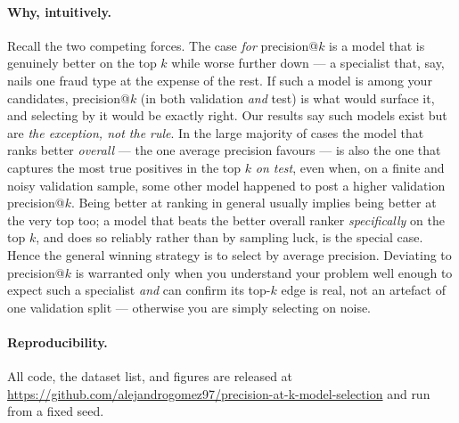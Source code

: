 \documentclass[11pt]{article}
\begin{document}
\paragraph{Why, intuitively.} Recall the two competing forces. The case \emph{for}
precision@$k$ is a model that is genuinely better on the top $k$ while worse further down ---
a specialist that, say, nails one fraud type at the expense of the rest. If such a model is
among your candidates, precision@$k$ (in both validation \emph{and} test) is what would surface
it, and selecting by it would be exactly right. Our results say such models exist but are
\emph{the exception, not the rule}. In the large majority of cases the model that ranks better
\emph{overall} --- the one average precision favours --- is also the one that captures the most
true positives in the top $k$ \emph{on test}, even when, on a finite and noisy validation
sample, some other model happened to post a higher validation precision@$k$. Being better at
ranking in general usually implies being better at the very top too; a model that beats the
better overall ranker \emph{specifically} on the top $k$, and does so reliably rather than by
sampling luck, is the special case. Hence the general winning strategy is to select by average
precision. Deviating to precision@$k$ is warranted only when you understand your problem well
enough to expect such a specialist \emph{and} can confirm its top-$k$ edge is real, not an
artefact of one validation split --- otherwise you are simply selecting on noise.

\paragraph{Reproducibility.} All code, the dataset list, and figures are released at
\url{https://github.com/alejandrogomez97/precision-at-k-model-selection} and run from a fixed seed.



\end{document}
